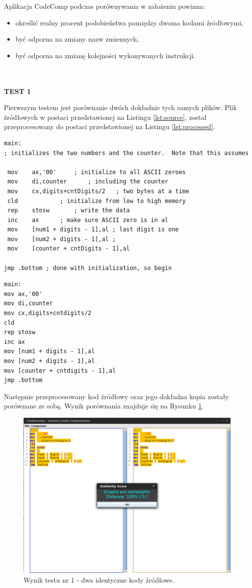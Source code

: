 \documentclass[a4paper,12pt]{article}
\begin{document}
Aplikacja CodeComp podczas porównywania w założeniu powinna:
\begin{itemize}
\item określić realny procent podobieństwa pomiędzy dwoma kodami źródłowymi,
\item być odporna na zmiany nazw zmiennych,
\item być odporna na zmianę kolejności wykonywanych instrukcji.
\end{itemize}
\\ \\
\textbf{TEST 1}

Pierwszym testem jest porównanie dwóch dokładnie tych samych plików. Plik źródłowych w postaci przedstawionej na Listingu \ref{lst:source}. został przeprocesowany do postaci przedstawionej na Listingu \ref{lst:processed}.
\begin{lstlisting}[caption={Przykładowy oryginalny kod źródłowy.}, label={lst:source}]
main:	
; initializes the two numbers and the counter.  Note that this assumes

 mov	ax,'00'		; initialize to all ASCII zeroes
 mov	di,counter		; including the counter
 mov	cx,digits+cntDigits/2	; two bytes at a time
 cld			; initialize from low to high memory
 rep	stosw		; write the data
 inc	ax		; make sure ASCII zero is in al
 mov	[num1 + digits - 1],al ; last digit is one
 mov	[num2 + digits - 1],al ; 
 mov	[counter + cntDigits - 1],al

jmp	.bottom	; done with initialization, so begin
\end{lstlisting}
\begin{lstlisting}[caption={Przykładowy przeprocesowany kod źródłowy.}, label={lst:processed}]
main:
mov ax,'00'
mov di,counter
mov cx,digits+cntdigits/2
cld
rep stosw
inc ax
mov [num1 + digits - 1],al
mov [num2 + digits - 1],al
mov [counter + cntdigits - 1],al
jmp .bottom
\end{lstlisting}
Następnie przeprocesowany kod źródłowy oraz jego dokładna kopia zostały porównane ze sobą. Wynik porównania znajduje się na Rysunku \ref{fig:test1}.
\begin{figure}[here]
\centering
\includegraphics[scale=0.4]{gfx/test1.png}
\caption{Wynik testu nr 1  - dwa identyczne kody źródłowe.}
\label{fig:test1}
\end{figure}
\end{document}
